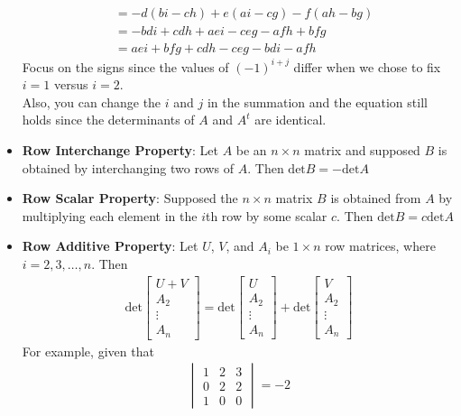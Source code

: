 \begin{itemize}
\begin{align*}
      &= -d(bi - ch) + e(ai - cg) - f(ah - bg)\\
      &= -bdi + cdh + aei - ceg - afh + bfg\\
      &= aei + bfg + cdh - ceg - bdi - afh
    \end{align*}
    Focus on the signs since the values of $(-1)^{i + j}$ differ when we chose to fix $i = 1$ versus $i = 2$.\\
    Also, you can change the $i$ and $j$ in the summation and the equation still holds since the determinants of $A$ and $A^{t}$ are identical.
  \item \textbf{Row Interchange Property}: Let $A$ be an $n \times n$ matrix and supposed $B$ is obtained by interchanging two rows of $A$.
    Then $\mathrm{det} B = - \mathrm{det} A$
  \item \textbf{Row Scalar Property}: Supposed the $n \times n$ matrix $B$ is obtained from $A$ by multiplying each element in the $i$th row by some scalar $c$.
    Then $\mathrm{det} B = c \mathrm{det} A$
  \item \textbf{Row Additive Property}: Let $U$, $V$, and $A_i$ be $1 \times n$ row matrices, where $i = 2, 3, \ldots, n$. Then
    \begin{align*}
      \mathrm{det} \begin{bmatrix}
        U + V\\
        A_2\\
        \vdots\\
        A_n
      \end{bmatrix}
      = \mathrm{det} \begin{bmatrix}
        U\\
        A_2\\
        \vdots\\
        A_n
      \end{bmatrix}
      + \mathrm{det} \begin{bmatrix}
        V\\
        A_2\\
        \vdots\\
        A_n
      \end{bmatrix}
    \end{align*}
    For example, given that
    \begin{align*}
      \begin{vmatrix}
        1 & 2 & 3\\
        0 & 2 & 2\\
        1 & 0 & 0
      \end{vmatrix} = -2

\end{align*}
\end{itemize}
